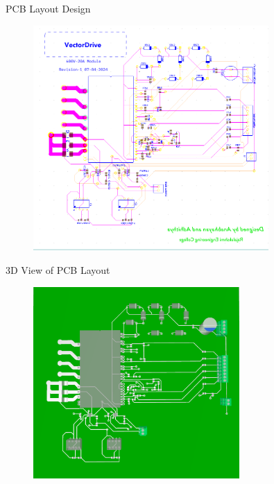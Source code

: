 \begin{frame}{PCB Layout Design}
	\begin{figure}
		\centering
		\includegraphics[width=0.8\textwidth]{sections/section4/images/PCBDesign/Ultiboard/Ultiboard.png}
	\end{figure}
\end{frame}

\begin{frame}{3D View of PCB Layout}
	\begin{figure}
		\centering
		\includegraphics[width=0.7\textwidth]{sections/section4/images/PCBDesign/Ultiboard/3DTopView.png}
	\end{figure}
\end{frame}

